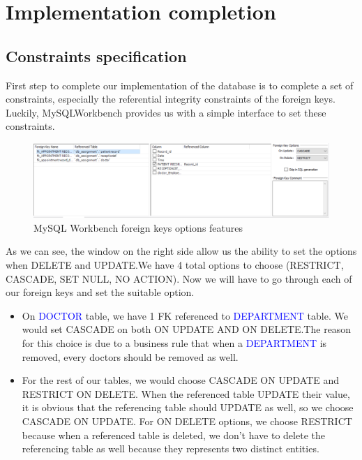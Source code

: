 \section{Implementation completion}

\subsection{Constraints specification}
First step to complete our implementation of the database is to complete a set of constraints, especially the referential integrity constraints of the foreign keys. Luckily, MySQLWorkbench provides us with a simple interface to set these constraints.

\begin{figure}[H]
  \centering
  \includegraphics[width = 12cm]{assets/constraints_1.png}
  \captionsetup{justification=centering,margin=2cm}
  \caption{MySQL Workbench foreign keys options features}
\end{figure}

As we can see, the window on the right side allow us the ability to set the options when DELETE and UPDATE.We have 4 total options to choose (RESTRICT, CASCADE, SET NULL, NO ACTION). Now we will have to go through each of our foreign keys and set the suitable option.

\begin{itemize}
  \item On \textcolor{blue}{DOCTOR} table, we have 1 FK referenced to \textcolor{blue}{DEPARTMENT} table. We would set CASCADE on both ON UPDATE AND ON DELETE.The reason for this choice is due to a business rule that when a \textcolor{blue}{DEPARTMENT} is removed, every doctors should be removed as well.
  \item For the rest of our tables, we would choose CASCADE ON UPDATE and RESTRICT ON DELETE. When the referenced table UPDATE their value, it is obvious that the referencing table should UPDATE as well, so we choose CASCADE ON UPDATE. For ON DELETE options, we choose RESTRICT because when a referenced table is deleted, we don't have to delete the referencing table as well because they represents two distinct entities.
\end{itemize}

